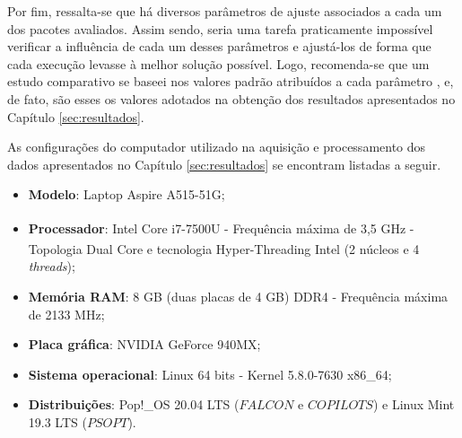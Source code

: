 Por fim, ressalta-se que há diversos parâmetros de ajuste associados a cada um dos pacotes avaliados. Assim sendo, seria uma tarefa praticamente impossível verificar a influência de cada um desses parâmetros e ajustá-los de forma que cada execução levasse à melhor solução possível. Logo, recomenda-se que um estudo comparativo se baseei nos valores padrão atribuídos a cada parâmetro \cite{mittelmann_benchmarking_1998}, e, de fato, são esses os valores adotados na obtenção dos resultados apresentados no Capítulo \ref{sec:resultados}.


As configurações do computador utilizado na aquisição e processamento dos dados apresentados no Capítulo \ref{sec:resultados} se encontram listadas a seguir. 
%
\begin{itemize}
	\item \textbf{Modelo}: Laptop Aspire A515-51G;
	\item \textbf{Processador}: Intel\textsuperscript{\textregistered} Core i7-7500U - Frequência máxima de 3,5 GHz - Topologia Dual Core e tecnologia Hyper-Threading Intel\textsuperscript{\textregistered} (2 núcleos e 4 \textit{threads});
	\item \textbf{Memória RAM}: 8 GB (duas placas de 4 GB) DDR4 - Frequência máxima de 2133 MHz; 
	\item \textbf{Placa gráfica}: NVIDIA GeForce 940MX;
	\item \textbf{Sistema operacional}: Linux 64 bits - Kernel 5.8.0-7630 x86\_64;
	\item \textbf{Distribuições}: Pop!\_OS 20.04 LTS ($ FALCON $ e $ COPILOTS $) e Linux Mint 19.3 LTS ($ PSOPT $).
\end{itemize}